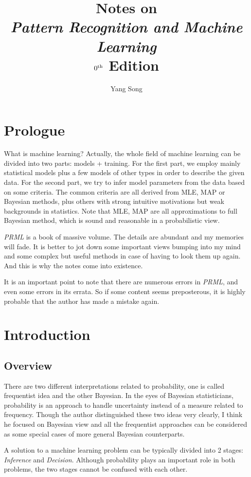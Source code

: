 \documentclass[a4paper]{report}
\title{Notes on \\ \emph{Pattern Recognition and Machine Learning}\\ $0^{\mathrm{th}}$ Edition}
\author{Yang Song}
\date{}
\newcommand{\imp}[1]{{\color{blue}\textit{#1}}}
\begin{document}
\maketitle

\chapter*{Prologue}
What is machine learning? Actually, the whole field of machine learning can be divided into two parts: models + training. For the first part, we employ mainly statistical models plus a few models of other types in order to describe the given data. For the second part, we try to infer model parameters from the data based on some criteria. The common criteria are all derived from MLE, MAP or Bayesian methods, plus others with strong intuitive motivations but weak backgrounds in statistics. Note that MLE, MAP are all approximations to full Bayesian method, which is sound and reasonable in a probabilistic view.

\textit{PRML} is a book of massive volume. The details are abundant and my memories will fade. It is better to jot down some important views bumping into my mind and some complex but useful methods in case of having to look them up again. And this is why the notes come into existence.

It is an important point to note that there are numerous errors in \textit{PRML}, and even some errors in its errata. So if some content seems preposterous, it is highly probable that the author has made a mistake again.
\setcounter{tocdepth}{4}
\tableofcontents
\newpage
\chapter{Introduction}
\setcounter{page}{1}
\section{Overview}
There are two different interpretations related to probability, one is called frequentist idea and the other Bayesian. In the eyes of Bayesian statisticians, probability is an approach to handle uncertainty instead of a measure related to frequency. Though the author distinguished these two ideas very clearly, I think he focused on Bayesian view and all the frequentist approaches can be considered as some special cases of more general Bayesian counterparts.

A solution to a machine learning problem can be typically divided into 2 stages: \imp{Inference} and \imp{Decision}. Although probability plays an important role in both problems, the two stages cannot be confused with each other. 
\end{document}
